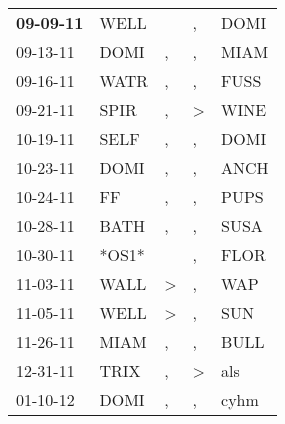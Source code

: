 \begin{supertabular}{p{0.07\textwidth}p{0.06\textwidth}p{0.02\textwidth}p{0.02\textwidth}p{0.06\textwidth}}
 \textbf{09-09-11\textsuperscript{}} &           WELL\textsuperscript{} &                  &                , &           DOMI\textsuperscript{} \\
          09-13-11\textsuperscript{} &           DOMI\textsuperscript{} &                , &                , &           MIAM\textsuperscript{} \\
          09-16-11\textsuperscript{} &           WATR\textsuperscript{} &                , &                , &           FUSS\textsuperscript{} \\
          09-21-11\textsuperscript{} &           SPIR\textsuperscript{} &                , &     \textgreater &           WINE\textsuperscript{} \\
          10-19-11\textsuperscript{} &           SELF\textsuperscript{} &                , &                , &           DOMI\textsuperscript{} \\
          10-23-11\textsuperscript{} &           DOMI\textsuperscript{} &                , &                , &           ANCH\textsuperscript{} \\
          10-24-11\textsuperscript{} &             FF\textsuperscript{} &                , &                , &           PUPS\textsuperscript{} \\
          10-28-11\textsuperscript{} &           BATH\textsuperscript{} &                , &                , &           SUSA\textsuperscript{} \\
          10-30-11\textsuperscript{} &                            *OS1* &                  &                , &           FLOR\textsuperscript{} \\
          11-03-11\textsuperscript{} &           WALL\textsuperscript{} &     \textgreater &                , &            WAP\textsuperscript{} \\
          11-05-11\textsuperscript{} &           WELL\textsuperscript{} &     \textgreater &                , &            SUN\textsuperscript{} \\
          11-26-11\textsuperscript{} &           MIAM\textsuperscript{} &                , &                , &           BULL\textsuperscript{} \\
          12-31-11\textsuperscript{} &           TRIX\textsuperscript{} &                , &     \textgreater &            als\textsuperscript{} \\
          01-10-12\textsuperscript{} &           DOMI\textsuperscript{} &                , &                , &           cyhm\textsuperscript{} \\

\end{supertabular}
